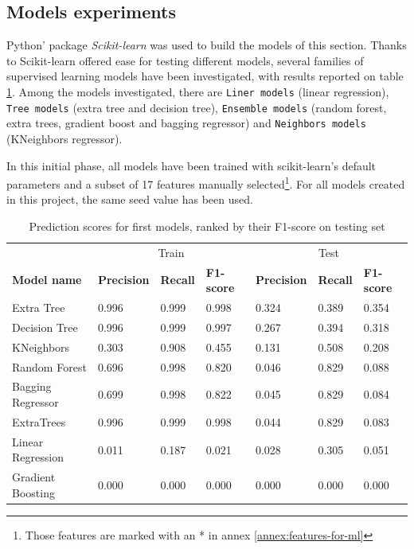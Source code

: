 \subsection{Models experiments}
Python' package \textit{Scikit-learn} was used to build the models of this section. Thanks to Scikit-learn offered ease for testing different models, several families of supervised learning models have been investigated, with results reported on table \ref{tab:scores-simple-models}. Among the models investigated, there are \texttt{Liner models} (linear regression), \texttt{Tree models} (extra tree and decision tree), \texttt{Ensemble models} (random forest, extra trees, gradient boost and bagging regressor) and \texttt{Neighbors models} (KNeighbors regressor).

In this initial phase, all models have been trained with scikit-learn's default parameters and a subset of 17 features manually selected\footnote{Those features are marked with an * in annex \ref{annex:features-for-ml}}. For all models created in this project, the same seed value has been used.

\begin{table}[!htb]
    \begin{tabular}{l|lll|lll}
                          & \multicolumn{3}{c|}{Train}                         & \multicolumn{3}{c}{Test}      \\
        \textbf{Model name}        & \textbf{Precision} & \textbf{Recall} & \textbf{F1-score} & \textbf{Precision} & \textbf{Recall} & \textbf{F1-score} \\ \hline
        Extra Tree        & 0.996     & 0.999  & 0.998                         & 0.324     & 0.389  & 0.354    \\
        Decision Tree     & 0.996     & 0.999  & 0.997                         & 0.267     & 0.394  & 0.318   \\
        KNeighbors        & 0.303     & 0.908  & 0.455                         & 0.131     & 0.508  & 0.208    \\
        Random Forest     & 0.696     & 0.998  & 0.820                         & 0.046     & 0.829  & 0.088    \\
        Bagging Regressor & 0.699     & 0.998  & 0.822                         & 0.045     & 0.829  & 0.084    \\
        ExtraTrees        & 0.996     & 0.999  & 0.998                         & 0.044     & 0.829  & 0.083    \\
        Linear Regression & 0.011     & 0.187  & 0.021                         & 0.028     & 0.305  & 0.051    \\
        Gradient Boosting & 0.000     & 0.000  & 0.000                         & 0.000     & 0.000  & 0.000    \\
    \end{tabular}
    \caption{Prediction scores for first models, ranked by their F1-score on testing set}
    \label{tab:scores-simple-models}
\end{table}

